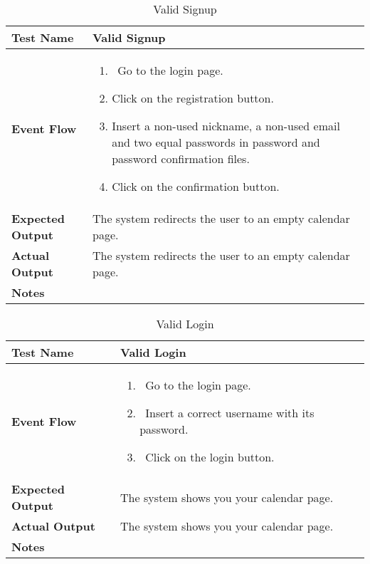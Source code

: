 \begin{table}[h]	
	\centering
	\def\arraystretch{1.5}
	\begin{tabular}{|m{7cm}|m{7cm}|}
		\hline
		\textbf{Test Name}            &  Valid Signup  \\ \hline
		\textbf{Event Flow}             &  
		\begin{enumerate}
			\item~Go to the login page.
			\item Click on the registration button.
			\item Insert a non-used nickname, a non-used email and two equal passwords in password and password confirmation files.
			\item Click on the confirmation button.
		\end{enumerate} \\ \hline
		\textbf{Expected Output}  &  The system redirects the user to an empty calendar page.   \\ \hline
		\textbf{Actual Output}       & The system redirects the user to an empty calendar page.    \\ \hline
		\textbf{Notes} & \\ \hline
	\end{tabular}
	\caption{Valid Signup}
\end{table}


\begin{table}[h]	
	\centering
	\def\arraystretch{1.5}
	\begin{tabular}{|m{7cm}|m{7cm}|}
		\hline
		\textbf{Test Name}            &  Valid Login  \\ \hline
		\textbf{Event Flow}             &  
		\begin{enumerate}
			\item~Go to the login page.
			\item~Insert a correct username with its password.
			\item~Click on the login button.
		\end{enumerate}
		\\ \hline
		\textbf{Expected Output}  &  The system shows you your calendar page.   \\ \hline
		\textbf{Actual Output}       &  The system shows you your calendar page.   \\ \hline
		\textbf{Notes} & \\ \hline
	\end{tabular}
	\caption{Valid Login}
\end{table}



